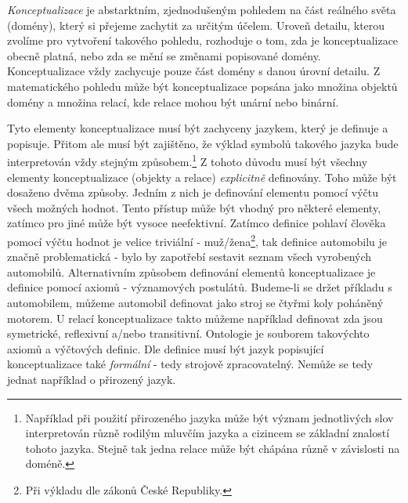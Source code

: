 \documentclass[11pt,twoside,a4paper]{book}
\begin{document}
		\textit{Konceptualizace} je abstarktním, zjednodušeným pohledem na část reálného světa (domény), který si přejeme zachytit za určitým účelem.\cite{ontologie01} Uroveň detailu, kterou zvolíme pro vytvoření takového pohledu, rozhoduje o tom, zda je konceptualizace obecně platná, nebo zda se mění se změnami popisované domény. Konceptualizace vždy zachycuje pouze část domény s danou úrovní detailu. Z matematického pohledu může být konceptualizace popsána jako množina objektů domény a množina relací, kde relace mohou být unární nebo binární.\cite{ontologied04} 

		Tyto elementy konceptualizace musí být zachyceny jazykem, který je definuje a popisuje. Přitom ale musí být zajištěno, že výklad symbolů takového jazyka bude interpretován vždy stejným způsobem.\footnote{Například při použití přirozeného jazyka může být význam jednotlivých slov interpretován různě rodilým mluvčím jazyka a cizincem se základní znalostí tohoto jazyka. Stejně tak jedna relace může být chápána různě v závislosti na doméně.} Z tohoto důvodu musí být všechny elementy konceptualizace (objekty a relace) \textit{explicitně} definovány. Toho může být dosaženo dvěma způsoby. Jedním z nich je definování elementu pomocí výčtu všech možných hodnot. Tento přístup může být vhodný pro některé elementy, zatímco pro jiné může být vysoce neefektivní. Zatímco definice pohlaví člověka pomocí výčtu hodnot je velice triviální - muž/žena\footnote{Při výkladu dle zákonů České Republiky.}, tak definice automobilu je značně problematická - bylo by zapotřebí sestavit seznam všech vyrobených automobilů. Alternativním způsobem definování elementů konceptualizace je definice pomocí axiomů - významových postulátů.\cite{ontologiee05} Budeme-li se držet příkladu s automobilem, můžeme automobil definovat jako stroj se čtyřmi koly poháněný motorem. U relací konceptualizace takto můžeme například definovat zda jsou symetrické, reflexivní a/nebo transitivní. Ontologie je souborem takovýchto axiomů a výčtových definic. Dle definice musí být jazyk popisující konceptualizace také \textit{formální} - tedy strojově zpracovatelný. Nemůže se tedy jednat například o přirozený jazyk.\cite{ontologief06}
\end{document}
